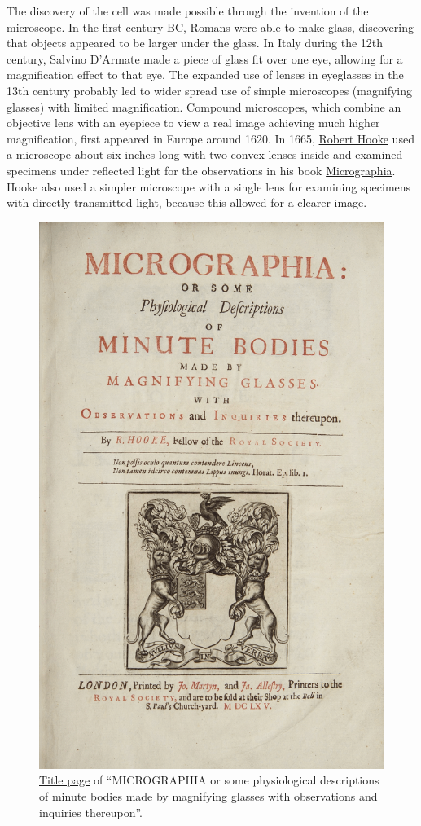 The discovery of the cell was made possible through the invention of the microscope. In the first century BC, Romans were able to make glass, discovering that objects appeared to be larger under the glass. In Italy during the 12th century, Salvino D'Armate made a piece of glass fit over one eye, allowing for a magnification effect to that eye. The expanded use of lenses in eyeglasses in the 13th century probably led to wider spread use of simple microscopes (magnifying glasses) with limited magnification. Compound microscopes, which combine an objective lens with an eyepiece to view a real image achieving much higher magnification, first appeared in Europe around 1620. In 1665, \href{https://en.wikipedia.org/wiki/Robert_Hooke}{Robert Hooke} used a microscope about six inches long with two convex lenses inside and examined specimens under reflected light for the observations in his book \href{https://en.wikipedia.org/wiki/Micrographia}{Micrographia}. Hooke also used a simpler microscope with a single lens for examining specimens with directly transmitted light, because this allowed for a clearer image.



\begin{figure}

{\centering \includegraphics[width=0.7\linewidth]{./figures/cells/Micrographia_title_page} 

}

\caption{\href{https://commons.wikimedia.org/wiki/File:Micrographia_title_page.gif}{Title page} of ``MICROGRAPHIA or some physiological descriptions of minute bodies made by magnifying glasses with observations and inquiries thereupon''.}\label{fig:hookemicrographia}
\end{figure}




